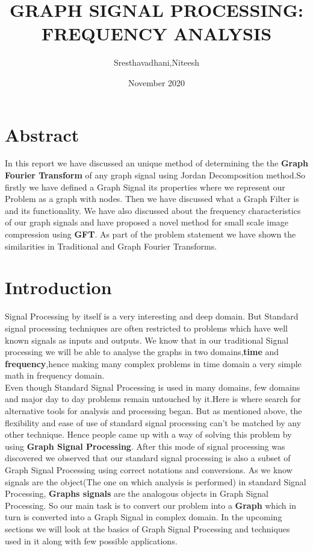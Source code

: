 \documentclass[12pt,onecolumn]{article}
\begin{document}
\title{GRAPH SIGNAL PROCESSING:
FREQUENCY ANALYSIS}
\author{Sresthavadhani,Niteesh}
\date{November 2020}
\maketitle
\section{\textbf{Abstract}}
In this report we have discussed an unique method of determining the the \textbf{Graph Fourier Transform} of any graph signal using Jordan Decomposition method.So firstly we have defined a Graph Signal its properties where we represent our Problem as a graph with nodes. Then we have discussed what a Graph Filter is and its functionality. We have also discussed about the frequency characteristics of our graph signals and have proposed a novel method for small scale image compression using \textbf{GFT}. As part of the problem statement we have shown the similarities in Traditional and Graph Fourier Transforms.

\section{\textbf{Introduction}}
Signal Processing by itself is a very interesting and deep domain. But Standard signal processing techniques are often restricted to problems which have well known signals as inputs and outputs. We know that in our traditional Signal processing we will be able to analyse the graphs in two domains,\textbf{time} and \textbf{frequency},hence making many complex problems in time domain a very simple math in frequency domain.
\newline \\
Even though Standard Signal Processing is used in many domains, few domains and major day to day problems remain untouched by it.Here is where search for alternative tools for analysis and processing began. But as mentioned above, the flexibility and ease of use of standard signal processing can't be matched by any other technique. Hence people came up with a way of solving this problem by using \textbf{Graph Signal Processing}. After this mode of signal processing was discovered we observed that our standard signal processing is also a subset of Graph Signal Processing using correct notations and conversions.
\newline
\newline
As we know signals are the object(The one on which analysis is performed) in standard Signal Processing, \textbf{Graphs signals} are the analogous objects in Graph Signal Processing. So our main task is to convert our problem into a \textbf{Graph} which in turn is converted into a Graph Signal in complex domain.
\newline
\newline
In the upcoming sections we will look at the basics of Graph Signal \newline Processing and techniques used in it along with few possible applications.
\end{document}
